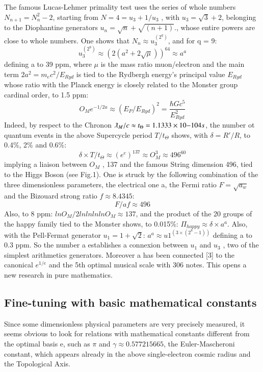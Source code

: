 \documentclass[twoside,draft]{article}
\begin{document}
{The famous Lucas-Lehmer primality test uses the series of whole numbers $N_{n+1} = N_{n}^{2}-2$,
starting from $N = 4 = u_{3} + 1/u_{3}$ , with $u_{3} = \sqrt{3} + 2$, belonging to the Diophantine generators $u_{n} = \sqrt{n} + \sqrt{(n+1)}$., whose entire powers are close to whole numbers. One shows that $N_{n} \approx u_{3}^{(2^{q})}$, and for q = 9:
\begin{equation}
u_{3}^(2^9) \approx (2(a^{2} + 2\sqrt{\mu}))^{64} \approx a^{a}
\end{equation}
defining a to 39 ppm, where $\mu$ is the mass ratio muon/electron and the main term $2a^{2} = m_{e} c^{2}/E_{Ryd}$ is
tied to the Rydbergh energy's principal value $E_{Ryd}$ whose ratio with the Planck energy is closely
related to the Monster group cardinal order, to 1.5 ppm:
\begin{equation}
O_{M} e^{-1/2a} \approx (E_{P} /E_{Ryd})^{2} = \frac{\hbar Gc^{5}}{E_{Ryd}^{2}}
\end{equation}
Indeed, by respect to the Chronon $\lambdabar_M /c \approx t_{\Theta} = 1.1333 \times 10{-104} s$, the number ot quantum events in
the above Supercycle period $T/ t_{\Theta}$ shows, with $\delta = R\prime/R$, to 0.4\%, 2\% and 0.6\%:
$$\delta \times T/t_{\Theta} \approx (e^{e})^{137} \approx O_{M}^{3} \approx 496^{60}$$
implying a liaison between $O_{M}$ , 137 and the famous String dimension 496, tied to the Higgs Boson
(see Fig.1). One is struck by the following combination of the three dimensionless parameters, the electrical
one a, the Fermi ratio $F =\sqrt{a_{w}}$ and the Bizouard strong ratio $f \approx 8.4345$:
$$F/af \approx 496$$
Also, to 8 ppm: $lnO_{M} /2lnlnlnlnO_{M} \approx 137$, and the product of the 20 groups of the happy family tied
to the Monster shows, to 0.015\%:
$\Pi_{happy} \approx \delta \times a^{a}$. Also, with the Pell-Fermat generator $u_{1} = 1 + \sqrt{2}$:
$a^{a} \approx u 1^(3\times(2^{8}-1))$
defining a to 0.3 ppm. So the number a establishes a connexion between $u_{1}$ and $u_{3}$ , two of the
simplest arithmetics generators. Moreover a has been connected [3] to the canonical $e^{1/e}$ and the
5th optimal musical scale with 306 notes. This opens a new research in pure mathematics.

\subsection{Fine-tuning with basic mathematical constants}
Since some dimensionless physical parameters are very precisely measured, it seems obvious to look for
relations with mathematical constants different from the optimal basis e, such as $\pi$ and $\gamma \approx
0.577215665$, the Euler-Mascheroni constant, which appears already in the above single-electron
cosmic radius and the Topological Axis.

}
\end{document}

